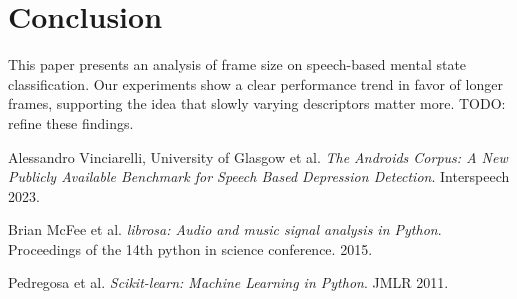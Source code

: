 \documentclass[conference]{IEEEtran}
\begin{document}
\section{Conclusion}
This paper presents an analysis of frame size on speech-based mental state classification. 
Our experiments show a clear performance trend in favor of longer frames, supporting the idea that slowly varying descriptors matter more. 
TODO: refine these findings.

\begin{thebibliography}{9}
Alessandro Vinciarelli, University of Glasgow et al. \textit{The Androids Corpus: A New Publicly Available Benchmark for Speech Based Depression Detection}. Interspeech 2023.

Brian McFee et al. \textit{librosa: Audio and music signal analysis in Python}. Proceedings of the 14th python in science conference. 2015.

Pedregosa et al. \textit{Scikit-learn: Machine Learning in Python}. JMLR 2011.

\end{thebibliography}
\end{document}
